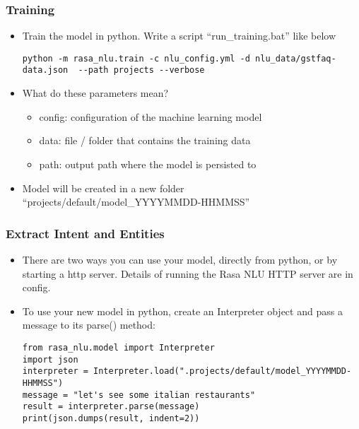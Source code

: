  \begin{frame}[fragile]\frametitle{Training}
\begin{itemize}
\item Train the model in python. Write a script ``run\_training.bat'' like below
\begin{lstlisting}
python -m rasa_nlu.train -c nlu_config.yml -d nlu_data/gstfaq-data.json  --path projects --verbose
\end{lstlisting}
\item What do these parameters mean?

\begin{itemize}
\item config: configuration of the machine learning model
\item data: file / folder that contains the training data
\item path: output path where the model is persisted to
\end{itemize}
\item Model will be created in a new folder ``projects/default/model\_YYYYMMDD-HHMMSS''
\end{itemize}
\end{frame}

 \begin{frame}[fragile]\frametitle{Extract Intent and Entities}
\begin{itemize}
\item There are two ways you can use your model, directly from python, or by starting a http server. Details of running the Rasa NLU HTTP server are in config.
\item To use your new model in python, create an Interpreter object and pass a message to its parse() method:
\begin{lstlisting}
from rasa_nlu.model import Interpreter
import json
interpreter = Interpreter.load(".projects/default/model_YYYYMMDD-HHMMSS")
message = "let's see some italian restaurants"
result = interpreter.parse(message)
print(json.dumps(result, indent=2))
\end{lstlisting}
\end{itemize}

\end{frame}

